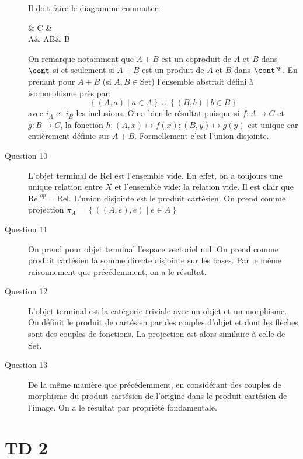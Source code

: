 \documentclass[math, info]{cours}
\begin{document}
\begin{description}
	      Il doit faire le diagramme commuter:
	      \begin{category}[]
		      & C &\\
		      A\arrow[ur, "f"]\arrow[r, "i_{A}" swap] & A\bigsqcup B\arrow[dashed, "h", u] & B\arrow[ul, "g" swap]\arrow[l, "i_{2}"]
	      \end{category}
	      On remarque notamment que $A + B$ est un coproduit de $A$ et $B$ dans $\cont$ si et seulement si $A + B$ est un produit de $A$ et $B$ dans $\cont^{op}$.
	      En prenant pour $A + B$ (si $A, B \in \mathrm{Set}$) l'ensemble abstrait défini à isomorphisme près par:
	      \begin{equation*}
		      \left\{ (A, a) \mid a\in A \right\} \cup \left\{ (B, b) \mid b \in B \right\}
	      \end{equation*}
	      avec $i_{A}$ et $i_{B}$ les inclusions.
	      On a bien le résultat puisque si $f: A \to C$ et $g: B\to C$, la fonction $h: (A, x) \mapsto f(x); (B, y) \mapsto g(y)$ est unique car entièrement définie sur $A + B$.
	      Formellement c'est l'union disjointe.
	\item[Question 10] L'objet terminal de $\mathrm{Rel}$ est l'ensemble vide. En effet, on a toujours une unique relation entre $X$ et l'ensemble vide: la relation vide.
	      Il est clair que $\mathrm{Rel}^{op} = \mathrm{Rel}$.
	      L'union disjointe est le produit cartésien.
	      On prend comme projection $\pi_{A} = \left\{ \left( (A, e), e \right)\mid e \in A \right\}$
	\item[Question 11] On prend pour objet terminal l'espace vectoriel nul.
	      On prend comme produit cartésien la somme directe disjointe sur les bases.
	      Par le même raisonnement que précédemment, on a le résultat.
	\item[Question 12] L'objet terminal est la catégorie triviale avec un objet et un morphisme.
	      On définit le produit de cartésien par des couples d'objet et dont les flèches sont des couples de fonctions.
	      La projection est alors similaire à celle de $\mathrm{Set}$.
	\item[Question 13] De la même manière que précédemment, en considérant des couples de morphisme du produit cartésien de l'origine dans le produit cartésien de l'image.
	      On a le résultat par propriété fondamentale.
\end{description}



\section{TD 2}
\end{document}
